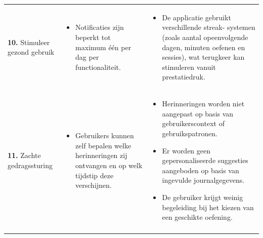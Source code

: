 {\begin{longtable}{
            >{\raggedright\arraybackslash}p{5.23cm}
            >{\raggedright\arraybackslash}p{4.93cm}
            >{\raggedright\arraybackslash}p{4.93cm}
        }
        \addlinespace[5pt]
        
        \textbf{10.} Stimuleer gezond gebruik
        & 
        \begin{itemize}[nosep,leftmargin=*,itemsep=10pt]
            \renewcommand{\labelitemi}{+}
            \item Notificaties zijn beperkt tot maximum één per dag per functionaliteit.
        \end{itemize}
        & 
        \begin{itemize}[nosep,leftmargin=*,itemsep=10pt]
            \renewcommand{\labelitemi}{-}
            \item De applicatie gebruikt verschillende streak- systemen (zoals aantal opeenvolgende dagen, minuten oefenen en sessies), wat terugkeer kan stimuleren vanuit prestatiedruk.
        \end{itemize}
        \\
        
        \addlinespace[5pt]
        
        \textbf{11.} Zachte gedragssturing
        & 
        \begin{itemize}[nosep,leftmargin=*,itemsep=10pt]
            \renewcommand{\labelitemi}{+}
            \item Gebruikers kunnen zelf bepalen welke herinneringen zij ontvangen en op welk tijdstip deze verschijnen.
        \end{itemize}
        & 
        \begin{itemize}[nosep,leftmargin=*,itemsep=10pt]
            \renewcommand{\labelitemi}{-}
            \item Herinneringen worden niet aangepast op basis van gebruikerscontext of gebruikspatronen.
            \item Er worden geen gepersonaliseerde suggesties aangeboden op basis van ingevulde journalgegevens.
            \item De gebruiker krijgt weinig begeleiding bij het kiezen van een geschikte oefening.
        \end{itemize}
        \\
        
        \addlinespace[5pt]
        

\end{longtable}}
